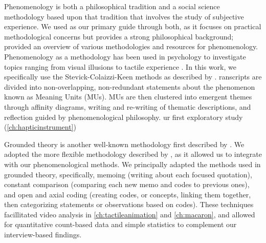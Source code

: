 Phenomenology is both a philosophical tradition and a social science methodology based upon that tradition that involves the study of subjective experience.
We used \citet{Moustakas1994} as our primary guide through both, as it focuses on practical methodological concerns but provides a strong philosophical background; \citet{Creswell2013} provided an overview of various methodologies and resources for phenomenology.
Phenomenology as a methodology has been used in psychology to investigate topics ranging from visual illusions to tactile experience \cite{Richer1978, Obrist2013, Creswell2013}.
In this work, we specifically use the Stevick-Colaizzi-Keen methods as described by \citet{Moustakas1994}.
ranscripts are divided into non-overlapping, non-redundant statements about the phenomenon known as Meaning Units (MUs).
MUs are then clustered into emergent themes through affinity diagrams, writing and re-writing of thematic descriptions, and reflection guided by phenomenological philosophy.
ur first exploratory study (\autoref{ch:hapticinstrument})  %

Grounded theory is another well-known methodology first described by \citet{glaser1966awareness}.
We adopted the more flexible methodology described by \citet{Corbin2008}, as it allowed us to integrate with our phenomenological methods.
We principally adapted the methods used in grounded theory, specifically, memoing (writing about each focused quotation), constant comparison (comparing each new memo and codes to previous ones), and open and axial coding (creating codes, or concepts, linking them together, then categorizing statements or observations based on codes).
These techniques facillitated video analysis in \autoref{ch:tactileanimation} and \autoref{ch:macaron}, and allowed for quantitative count-based data and simple statistics to complement our interview-based findings.

